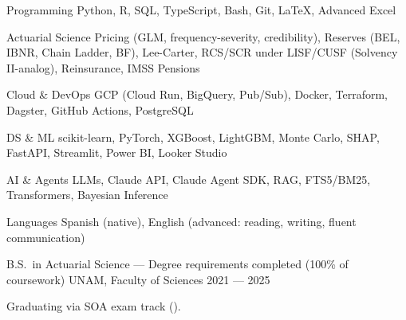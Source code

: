 \documentclass[10pt, letterpaper]{awesome-cv}
\begin{document}

\begin{cvskills}
  \cvskill
    {Programming}
    {Python, R, SQL, TypeScript, Bash, Git, \LaTeX, Advanced Excel}

  \cvskill
    {Actuarial Science}
    {Pricing (GLM, frequency-severity, credibility), Reserves (BEL, IBNR, Chain Ladder, BF), Lee-Carter, RCS/SCR under LISF/CUSF (Solvency II-analog), Reinsurance, IMSS Pensions}

  \cvskill
    {Cloud \& DevOps}
    {GCP (Cloud Run, BigQuery, Pub/Sub), Docker, Terraform, Dagster, GitHub Actions, PostgreSQL}

  \cvskill
    {DS \& ML}
    {scikit-learn, PyTorch, XGBoost, LightGBM, Monte Carlo, SHAP, FastAPI, Streamlit, Power BI, Looker Studio}

  \cvskill
    {AI \& Agents}
    {LLMs, Claude API, Claude Agent SDK, RAG, FTS5/BM25, Transformers, Bayesian Inference}

  \cvskill
    {Languages}
    {Spanish (native), English (advanced: reading, writing, fluent communication)}
\end{cvskills}


\begin{cventries}
  \cventry
    {B.S.\ in Actuarial Science — Degree requirements completed (100\% of coursework)}
    {UNAM, Faculty of Sciences}
    {}
    {2021 — 2025}
    {
      \begin{cvitems}
        \item {Graduating via SOA exam track ().}
      \end{cvitems}
    }
\end{cventries}

\end{document}
